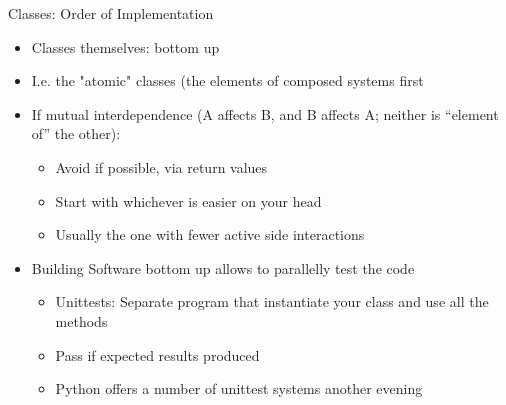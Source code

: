 \begin{frame}{Classes: Order of Implementation}
%
\begin{itemize}
\item Classes themselves: bottom up
\item I.\;e. the "atomic" classes (the elements of composed systems first
\item If mutual interdependence (A affects B, and B affects A; neither is \enquote{element of} the other):
	\begin{itemize}
	\item Avoid if possible, \zB via return values
	\item Start with whichever is easier on your head
	\item Usually the one with fewer active side interactions
	\end{itemize}
\item Building Software bottom up allows to parallelly test the code
	\begin{itemize}
	\item Unittests: Separate program that instantiate your class and use all the methods
	\item Pass if expected results produced
	\item Python offers a number of unittest systems \Thus another evening
	\end{itemize}
\end{itemize}
%
\end{frame}


